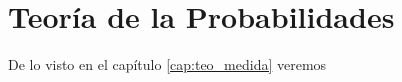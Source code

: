 \chapter{Teoría de la Probabilidades} \label{cap:teo_prob}
	\lipsum[5] \lipsum[4]
	
	De lo visto en el capítulo \ref{cap:teo_medida} veremos \lipsum[1]